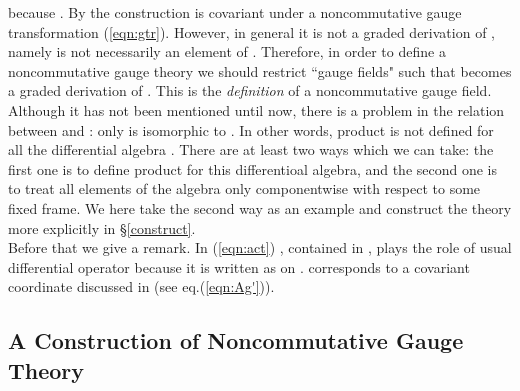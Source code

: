 \documentclass[10pt,a4paper]{article}
\def\h{\hbar}
\def\hA{{\hat A}}
\begin{document}
because \coordHE{}.
By the construction \coordHE{} is covariant under a noncommutative gauge transformation (\ref{eqn:gtr}). However, in general it is not a graded derivation of \coordHE{}, namely \coordHE{} is not necessarily an element of \coordHE{}. Therefore, in order to define a noncommutative gauge theory we should restrict ``gauge fields" \myHighlight{$\hA_\gamma$}\coordHE{} such that \coordHE{} becomes a graded derivation of \coordHE{}. This is the {\it definition} of a noncommutative gauge field. \\

Although it has not been mentioned until now, there is a problem in the relation between \coordHE{} and \myHighlight{$C^\infty(M)[[\h]]\otimes {\cal A}$}\coordHE{}: only \coordHE{} is isomorphic to \myHighlight{$C^\infty(M)[[\h]]\otimes {\cal A}$}\coordHE{}. In other words, \myHighlight{$*$}\coordHE{} product is not defined for all the differential algebra \myHighlight{$\Omega(C^\infty(M)[[\h]]\otimes {\cal A})$}\coordHE{}. There are at least two ways which we can take: the first one is to define \myHighlight{$*$}\coordHE{} product for this differentioal algebra, and the second one is to treat all elements of the algebra only componentwise with respect to some fixed frame.
We here take the second way as an example and construct the theory more explicitly in \S\ref{construct}.\\

Before that we give a remark. In (\ref{eqn:act}) \coordHE{}, contained in \myHighlight{$\hA_\gamma$}\coordHE{}, plays the role of usual differential operator because it is written as \myHighlight{$\nabla_La=-{i\over\h}[\gamma_T,a]$}\coordHE{} on \coordHE{}. \myHighlight{$\hA_\gamma$}\coordHE{} corresponds to a covariant coordinate discussed in \cite{MSSW} (see eq.(\ref{eqn:Ag'})).




\subsection{A Construction of Noncommutative Gauge Theory
\label{construct}}
\end{document}
